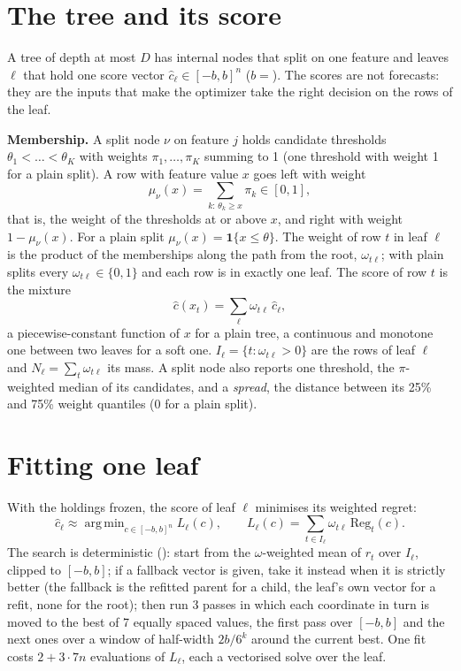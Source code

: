 \documentclass[11pt,a4paper]{article}
\newcommand{\code}[1]{\texttt{\detokenize{#1}}}
\DeclareMathOperator*{\argmin}{arg\,min}
\newcommand{\1}{\mathbf{1}}
\newcommand{\Reg}{\mathrm{Reg}}
\begin{document}
\section{The tree and its score}\label{sec:tree}
A tree of depth at most $D$ has internal nodes that split on one feature and leaves $\ell$ that hold one score vector $\hat c_\ell\in[-b,b]^n$ ($b={}$\code{prediction_bound}). The scores are not forecasts: they are the inputs that make the optimizer take the right decision on the rows of the leaf.

\textbf{Membership.} A split node $\nu$ on feature $j$ holds candidate thresholds $\theta_1<\dots<\theta_K$ with weights $\pi_1,\dots,\pi_K$ summing to 1 (one threshold with weight 1 for a plain split). A row with feature value $x$ goes left with weight
\begin{equation}\label{eq:membership}
\mu_\nu(x)=\sum_{k:\,\theta_k\ge x}\pi_k\in[0,1],
\end{equation}
that is, the weight of the thresholds at or above $x$, and right with weight $1-\mu_\nu(x)$. For a plain split $\mu_\nu(x)=\1\{x\le\theta\}$. The weight of row $t$ in leaf $\ell$ is the product of the memberships along the path from the root, $\omega_{t\ell}$; with plain splits every $\omega_{t\ell}\in\{0,1\}$ and each row is in exactly one leaf. The score of row $t$ is the mixture
\begin{equation}\label{eq:score}
\hat c(x_t)=\sum_\ell\omega_{t\ell}\,\hat c_\ell ,
\end{equation}
a piecewise-constant function of $x$ for a plain tree, a continuous and monotone one between two leaves for a soft one. $I_\ell=\{t:\omega_{t\ell}>0\}$ are the rows of leaf $\ell$ and $N_\ell=\sum_t\omega_{t\ell}$ its mass. A split node also reports one threshold, the $\pi$-weighted median of its candidates, and a \emph{spread}, the distance between its 25\% and 75\% weight quantiles ($0$ for a plain split).

\section{Fitting one leaf}\label{sec:leaf}
With the holdings frozen, the score of leaf $\ell$ minimises its weighted regret:
\begin{equation}\label{eq:leaf}
\hat c_\ell\approx\argmin_{c\in[-b,b]^n}L_\ell(c),\qquad L_\ell(c)=\sum_{t\in I_\ell}\omega_{t\ell}\,\Reg_t(c).
\end{equation}
The search is deterministic (\code{_fit_leaf}): start from the $\omega$-weighted mean of $r_t$ over $I_\ell$, clipped to $[-b,b]$; if a fallback vector is given, take it instead when it is strictly better (the fallback is the refitted parent for a child, the leaf's own vector for a refit, none for the root); then run 3 passes in which each coordinate in turn is moved to the best of 7 equally spaced values, the first pass over $[-b,b]$ and the next ones over a window of half-width $2b/6^k$ around the current best. One fit costs $2+3\cdot7n$ evaluations of $L_\ell$, each a vectorised solve over the leaf.
\end{document}

